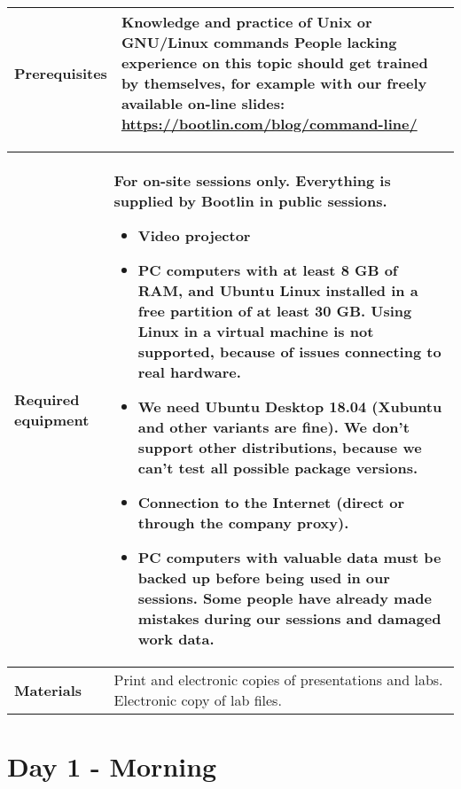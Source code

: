 \documentclass[a4paper,12pt,obeyspaces,spaces,hyphens]{article}
\begin{document}
{\begin{tabularx}{\textwidth}{|g|h|}
    {\bf Prerequisites} & {\bf Knowledge and practice of Unix or
      GNU/Linux commands}
    \newline People lacking experience on this topic should get
    trained by themselves, for example with our freely available
    on-line slides:
    \newline \url{https://bootlin.com/blog/command-line/} \vspace{1em}
     \\
    \hline
  \end{tabularx}

  \begin{tabularx}{\textwidth}{|g|h|}
    {\bf Required equipment} &
    {\bf For on-site sessions only.}
    \newline Everything is supplied by Bootlin in public sessions.
    \begin{itemize}
    \item Video projector
    \item PC computers with at least 8 GB of RAM, and Ubuntu Linux
    installed in a {\bf free partition of at least 30 GB. Using Linux
      in a virtual machine is not supported}, because of issues
    connecting to real hardware.
    \item We need Ubuntu Desktop 18.04 (Xubuntu and other
    variants are fine). We don't support other
    distributions, because we can't test all possible package versions.
    \item {\bf Connection to the Internet} (direct or through the
    company proxy).
    \item {\bf PC computers with valuable data must be backed up}
    before being used in our sessions.  Some people have already made
    mistakes during our sessions and damaged work data.
    \end{itemize}\\
    \hline

    {\bf Materials} & Print and electronic copies of presentations and
    labs.
    \newline Electronic copy of lab files.\\
    \hline

\end{tabularx}}
\normalsize


\section{Day 1 - Morning}
\end{document}
